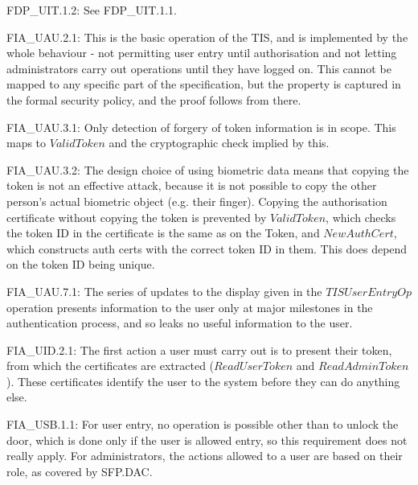 {\footnotesize \sf 
FDP\_UIT.1.2:
}
\newline
	See FDP\_UIT.1.1.


{\footnotesize \sf 
FIA\_UAU.2.1:
}
\newline
	This is the basic operation of the TIS, and is implemented by
	the whole behaviour - not permitting user entry until
	authorisation and not letting administrators carry out
	operations until they have logged on. This cannot be mapped to
	any specific part of the specification, but the property is
	captured in the formal security policy, and the proof follows
	from there. 

{\footnotesize \sf 
FIA\_UAU.3.1:
}
\newline
	Only detection of forgery of token information is in
	scope. This maps to $ValidToken$ and the cryptographic check
	implied by this. 

{\footnotesize \sf 
FIA\_UAU.3.2:
}
\newline
	The design choice of using biometric data means that copying
	the token is not an effective attack, because it is not
	possible to copy the other person's actual biometric object
	(e.g. their finger). Copying the authorisation certificate
	without copying the token is prevented by $ValidToken$, which
	checks the token ID in the certificate is the same as on the
	Token, and $NewAuthCert$, which constructs auth certs with the
	correct token ID in them. This does depend on the token ID
	being unique. 

{\footnotesize \sf 
FIA\_UAU.7.1:
}
\newline
	The series of updates to the display given in the
	$TISUserEntryOp$ operation presents information to the user only
	at major milestones in the authentication process, and so
	leaks no useful information to the user. 

{\footnotesize \sf 
FIA\_UID.2.1:
}
\newline
	The first action a user must carry out is to present their
	token, from which the certificates are extracted
	($ReadUserToken$ and $ReadAdminToken$). These certificates
	identify the user to the system before they can do anything
	else. 

{\footnotesize \sf 
FIA\_USB.1.1:
}
\newline
	For user entry, no operation is possible other than to unlock
	the door, which is done only if the user is allowed entry, so
	this requirement does not really apply. For administrators,
	the actions allowed to a user are based on their role, as
	covered by SFP.DAC. 

